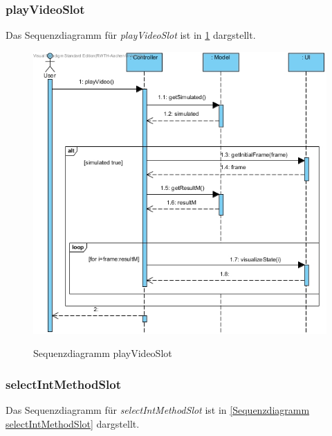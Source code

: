 \subsubsection*{playVideoSlot}

Das Sequenzdiagramm für \emph{playVideoSlot} ist in \ref{Sequenzdiagramm playVideoSlot} dargstellt.

\begin{figure}[H]
	\centering
	\includegraphics[scale=.6]{Bilder/Controller__playVideoSlot().jpg}\\
	\caption{Sequenzdiagramm playVideoSlot}
	\label{Sequenzdiagramm playVideoSlot}
\end{figure}

\subsubsection*{selectIntMethodSlot}

Das Sequenzdiagramm für \emph{selectIntMethodSlot} ist in \ref{Sequenzdiagramm selectIntMethodSlot} dargstellt.

